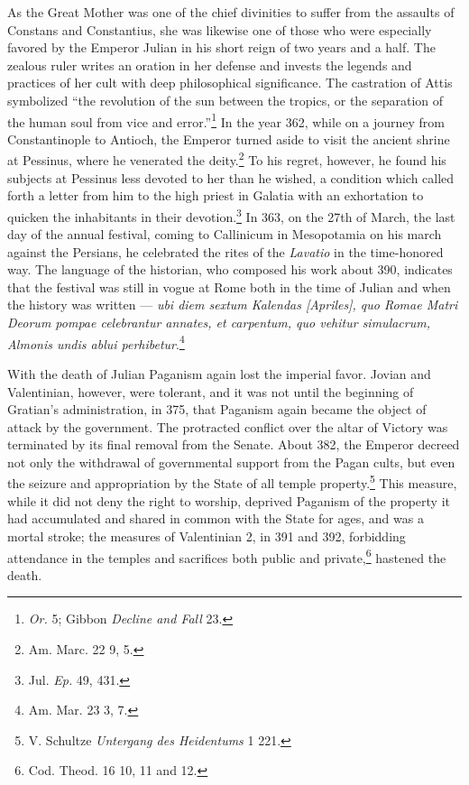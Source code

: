 \documentclass[a4paper, 11pt, oneside, polutonikogreek, english]{article}
\begin{document}
As the Great Mother was one of the chief divinities to suffer from the assaults of Constans and Constantius, she was likewise one of those who were especially favored by the Emperor Julian in his short reign of two years and a half. The zealous ruler writes an oration in her defense and invests the legends and practices of her cult with deep philosophical significance. The castration of Attis symbolized ``the revolution of the sun between the tropics, or the separation of the human soul from vice and error.''\footnote{\emph{Or.} 5; Gibbon \emph{Decline and Fall} 23.} In the year 362, while on a journey from Constantinople to Antioch, the Emperor turned aside to visit the ancient shrine at Pessinus, where he venerated the deity.\footnote{Am. Marc. 22 9, 5.} To his regret, however, he found his subjects at Pessinus less devoted to her than he wished, a condition which called forth a letter from him to the high priest in Galatia with an exhortation to quicken the inhabitants in their devotion.\footnote{Jul. \emph{Ep.} 49, 431.} In 363, on the 27th of March, the last day of the annual festival, coming to Callinicum in Mesopotamia on his march against the Persians, he celebrated the rites of the \emph{Lavatio} in the time-honored way. The language of the historian, who composed his work about 390, indicates that the festival was still in vogue at Rome both in the time of Julian and when the history was written --- \emph{ubi diem sextum Kalendas [Apriles], quo Romae Matri Deorum pompae celebrantur annates, et carpentum, quo vehitur simulacrum, Almonis undis ablui perhibetur}.\footnote{Am. Mar. 23 3, 7.}

With the death of Julian Paganism again lost the imperial favor. Jovian and Valentinian, however, were tolerant, and it was not until the beginning of Gratian's administration, in 375, that Paganism again became the object of attack by the government. The protracted conflict over the altar of Victory was terminated by its final removal from the Senate. About 382, the Emperor decreed not only the withdrawal of governmental support from the Pagan cults, but even the seizure and appropriation by the State of all temple property.\footnote{V. Schultze \emph{Untergang des Heidentums} 1 221.} This measure, while it did not deny the right to worship, deprived Paganism of the property it had accumulated and shared in common with the State for ages, and was a mortal stroke; the measures of Valentinian 2, in 391 and 392, forbidding attendance in the temples and sacrifices both public and private,\footnote{Cod. Theod. 16 10, 11 and 12.} hastened the death.
\end{document}
